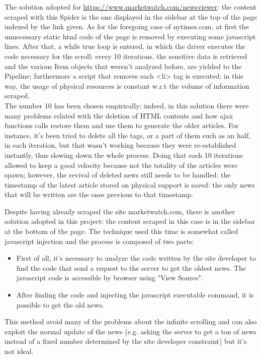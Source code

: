\par 
The solution adopted for \url{https://www.marketwatch.com/newsviewer}: the content scraped with this Spider is the one displayed in the sidebar at the top of the page indexed by the link given. As for the foregoing case of nytimes.com, at first the unnecessary static html code of the page is removed by executing some javascript lines. After that, a while true loop is entered, in which the driver executes the code necessary for the scroll: every 10 iterations, the sensitive data is retrieved and the various Item objects that weren't analyzed before, are yielded to the Pipeline; furthermore a script that removes each <li> tag is executed: in this way, the usage of physical resources is constant w.r.t the volume of information scraped. \\
The number 10 has been chosen empirically: indeed, in this solution there were many problems related with the deletion of HTML contents and how ajax functions calls restore them and use them to generate the older articles. For instance, it's been tried to delete all the tags, or a part of them such as an half, in each iteration, but that wasn't working because they were re-established instantly, thus slowing down the whole process. Doing that each 10 iterations allowed to keep a good velocity because not the totality of the articles were spawn; however, the revival of deleted news still needs to be handled: the timestamp of the latest article stored on physical support is saved: the only news that will be written are the ones previous to that timestamp.
\par 
Despite having already scraped the site marketwatch.com, there is another solution adopted in this project: the content scraped in this case is in the sidebar at the bottom of the page. The technique used this time is somewhat called javascript injection and the process is composed of two parts:
\begin{itemize}
	\item First of all, it's necessary to analyze the code written by the site developer to find the code that send a request to the server to get the oldest news. The javascript code is accessible by browser using "View Source".
	\item After finding the code and injecting the javascript executable command, it is possible to get the old news.
\end{itemize}
This method avoid many of the problems about the infinite scrolling and can also exploit the normal update of the news (e.g. asking the server to get a ton of news instead of a fixed number determined by the site developer constraint) but it's not ideal. 
